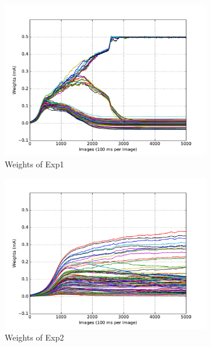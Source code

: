 \begin{figure}
	\centering
	\begin{subfigure}[t]{0.4\textwidth}
		\includegraphics[width=\textwidth]{pics_sdlm/11_exp_SRBM_Orig_long/exp1_weights_s.pdf}
		\caption{Weights of Exp1}
	\end{subfigure}
	\begin{subfigure}[t]{0.4\textwidth}
		\includegraphics[width=\textwidth]{pics_sdlm/11_exp_SRBM_Orig_long/exp2_weights_s.pdf}
		\caption{Weights of Exp2}
	\end{subfigure}
	\begin{subfigure}[t]{0.4\textwidth}

\end{subfigure}
\end{figure}
